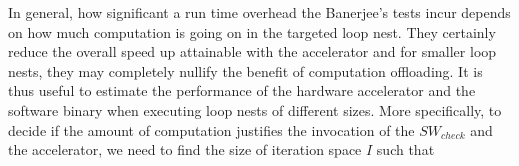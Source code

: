 In general, how significant a run time overhead the Banerjee's tests incur depends on how much computation is going on in the targeted loop nest.
They certainly reduce the overall speed up attainable with the accelerator and for smaller loop nests, they may completely nullify the benefit of computation offloading. %
It is thus useful to estimate the performance of the hardware accelerator and the software binary when executing loop nests of different sizes. More specifically, to decide if the amount of computation justifies the invocation of the  $SW_{check}$ and the accelerator, we need to find the size of iteration space $I$ such that

